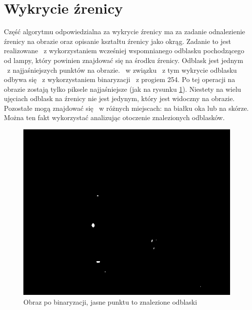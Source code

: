 \section{Wykrycie źrenicy}
\label{sec:wykrycieZrenicy}
Część algorytmu odpowiedzialna za wykrycie źrenicy ma za zadanie odnalezienie źrenicy na obrazie oraz opisanie kształtu źrenicy jako okrąg. Zadanie to jest realizowane ~z wykorzystaniem wcześniej wspomnianego odblasku pochodzącego od lampy, który powinien znajdować się na środku źrenicy. Odblask jest jednym ~z najjaśniejszych punktów na obrazie. ~w związku ~z tym wykrycie odblasku odbywa się ~z wykorzystaniem binaryzacji ~z progiem 254. Po tej operacji na obrazie zostają tylko piksele najjaśniejsze (jak na rysunku \ref{fig:binaryzacja}). Niestety na wielu ujęciach odblask na źrenicy nie jest jedynym, który jest widoczny na obrazie. Pozostałe mogą znajdować się ~w różnych miejscach: na białku oka lub na skórze. Można ten fakt wykorzystać analizując otoczenie znalezionych odblasków. 
\begin{figure}
\begin{center}
\includegraphics[scale=0.5]{binaryzacja.jpg}
\caption{Obraz po binaryzacji, jasne punktu to znalezione odblaski}
\label{fig:binaryzacja}
\end{center}
\end{figure}

